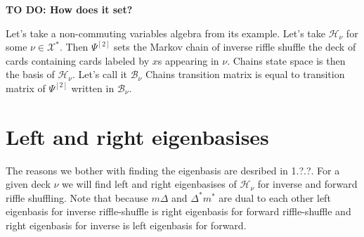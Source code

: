 \documentclass[a4paper, 12pt]{article}
\newcommand{\todo}[1]{\hfill \break \textbf{\Huge TO DO: #1 \hfill \break}\normalsize}
\begin{document}
\todo{How does it set?}

Let's take a non-commuting variables algebra from its example. Let's take $\mathcal{H}_\nu$ for some
$\nu \in \mathcal{X}^*$. Then $\Psi^{[2]}$ sets the Markov chain of inverse riffle shuffle the deck of cards
containing cards labeled by $x$s appearing in $\nu$. Chains state space is then the basis of
$\mathcal{H}_\nu$. Let's call it $\mathcal{B}_\nu$
Chains transition matrix is equal to transition matrix of $\Psi^{[2]}$ written in $\mathcal{B}_\nu$.  \\




\section{Left and right eigenbasises}

The reasons we bother with finding the eigenbasis are desribed in 1.?.?. For a given deck $\nu$
we will find left and right eigenbasises of $\mathcal{H}_\nu$ for inverse and forward riffle shuffling.
Note that because
$m\Delta$ and $\Delta^*m^*$ are dual to each other left eigenbasis for inverse riffle-shuffle is right
eigenbasis for forward riffle-shuffle and right eigenbasis for inverse is left eigenbasis for forward.
\end{document}
